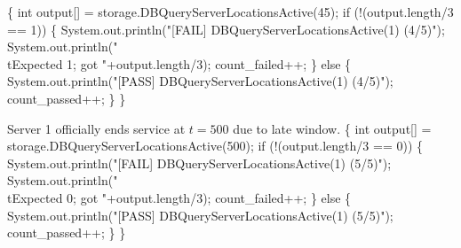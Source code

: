 \documentclass{article}
\def\nwendcode{\endtrivlist \endgroup}
\let\nwdocspar=\par
\begin{document}
\{
  int output[] = storage.DBQueryServerLocationsActive(45);
  if (!(output.length/3 == 1)) \{
    System.out.println("[FAIL] DBQueryServerLocationsActive(1) (4/5)");
    System.out.println("\\tExpected 1; got "+output.length/3);
    count_failed++;
  \} else \{
    System.out.println("[PASS] DBQueryServerLocationsActive(1) (4/5)");
    count_passed++;
  \}
\}
\nwendcode{}\nwdocspar
Server 1 officially ends service at $t=500$ due to late window.
\nwenddocs{}\endmoddef{}
\{
  int output[] = storage.DBQueryServerLocationsActive(500);
  if (!(output.length/3 == 0)) \{
    System.out.println("[FAIL] DBQueryServerLocationsActive(1) (5/5)");
    System.out.println("\\tExpected 0; got "+output.length/3);
    count_failed++;
  \} else \{
    System.out.println("[PASS] DBQueryServerLocationsActive(1) (5/5)");
    count_passed++;
  \}
\}
\nwendcode{}\nwdocspar
\end{document}
